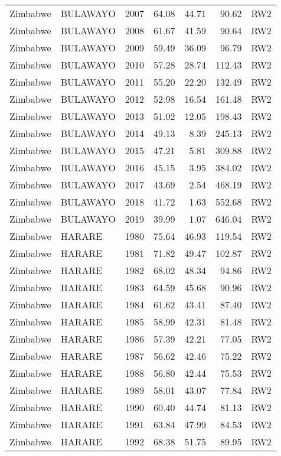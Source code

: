 \begin{longtable}{lllrrrl}
  Zimbabwe & BULAWAYO & 2007 & 64.08 & 44.71 & 90.62 & RW2 \\ 
  Zimbabwe & BULAWAYO & 2008 & 61.67 & 41.59 & 90.64 & RW2 \\ 
  Zimbabwe & BULAWAYO & 2009 & 59.49 & 36.09 & 96.79 & RW2 \\ 
  Zimbabwe & BULAWAYO & 2010 & 57.28 & 28.74 & 112.43 & RW2 \\ 
  Zimbabwe & BULAWAYO & 2011 & 55.20 & 22.20 & 132.49 & RW2 \\ 
  Zimbabwe & BULAWAYO & 2012 & 52.98 & 16.54 & 161.48 & RW2 \\ 
  Zimbabwe & BULAWAYO & 2013 & 51.02 & 12.05 & 198.43 & RW2 \\ 
  Zimbabwe & BULAWAYO & 2014 & 49.13 & 8.39 & 245.13 & RW2 \\ 
  Zimbabwe & BULAWAYO & 2015 & 47.21 & 5.81 & 309.88 & RW2 \\ 
  Zimbabwe & BULAWAYO & 2016 & 45.15 & 3.95 & 384.02 & RW2 \\ 
  Zimbabwe & BULAWAYO & 2017 & 43.69 & 2.54 & 468.19 & RW2 \\ 
  Zimbabwe & BULAWAYO & 2018 & 41.72 & 1.63 & 552.68 & RW2 \\ 
  Zimbabwe & BULAWAYO & 2019 & 39.99 & 1.07 & 646.04 & RW2 \\ 
  Zimbabwe & HARARE & 1980 & 75.64 & 46.93 & 119.54 & RW2 \\ 
  Zimbabwe & HARARE & 1981 & 71.82 & 49.47 & 102.87 & RW2 \\ 
  Zimbabwe & HARARE & 1982 & 68.02 & 48.34 & 94.86 & RW2 \\ 
  Zimbabwe & HARARE & 1983 & 64.59 & 45.68 & 90.96 & RW2 \\ 
  Zimbabwe & HARARE & 1984 & 61.62 & 43.41 & 87.40 & RW2 \\ 
  Zimbabwe & HARARE & 1985 & 58.99 & 42.31 & 81.48 & RW2 \\ 
  Zimbabwe & HARARE & 1986 & 57.39 & 42.21 & 77.05 & RW2 \\ 
  Zimbabwe & HARARE & 1987 & 56.62 & 42.46 & 75.22 & RW2 \\ 
  Zimbabwe & HARARE & 1988 & 56.80 & 42.44 & 75.53 & RW2 \\ 
  Zimbabwe & HARARE & 1989 & 58.01 & 43.07 & 77.84 & RW2 \\ 
  Zimbabwe & HARARE & 1990 & 60.40 & 44.74 & 81.13 & RW2 \\ 
  Zimbabwe & HARARE & 1991 & 63.84 & 47.99 & 84.53 & RW2 \\ 
  Zimbabwe & HARARE & 1992 & 68.38 & 51.75 & 89.95 & RW2 \\ 

\end{longtable}
